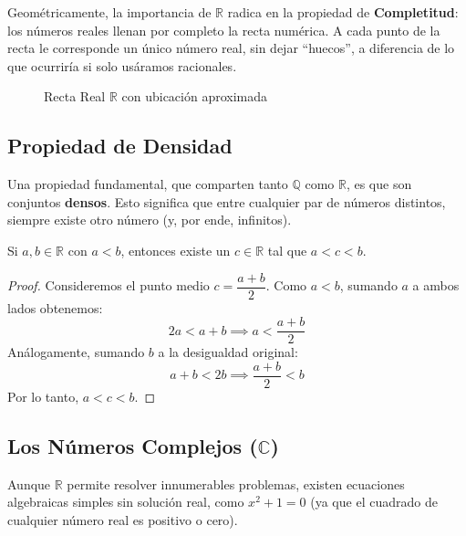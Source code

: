 Geométricamente, la importancia de $\mathbb{R}$ radica en la propiedad de \textbf{Completitud}: los números reales llenan por completo la recta numérica. A cada punto de la recta le corresponde un único número real, sin dejar ``huecos'', a diferencia de lo que ocurriría si solo usáramos racionales.

\begin{figure}[ht]
    \centering
    \caption{Recta Real $\mathbb{R}$ con ubicación aproximada}
    \label{fig:rectareal}
\end{figure}

\subsection{Propiedad de Densidad}
Una propiedad fundamental, que comparten tanto $\mathbb{Q}$ como $\mathbb{R}$, es que son conjuntos \textbf{densos}. Esto significa que entre cualquier par de números distintos, siempre existe otro número (y, por ende, infinitos).

\begin{proposition}
    Si $a,b\in\mathbb{R}$ con $a<b$, entonces existe un $c\in\mathbb{R}$ tal que $a<c<b$.
\end{proposition}

\begin{proof}
    Consideremos el punto medio $c=\dfrac{a+b}{2}$.
    Como $a<b$, sumando $a$ a ambos lados obtenemos:
    \[ 2a < a+b \implies a < \frac{a+b}{2} \]
    Análogamente, sumando $b$ a la desigualdad original:
    \[ a+b < 2b \implies \frac{a+b}{2} < b \]
    Por lo tanto, $a < c < b$.
\end{proof}

\subsection{Los Números Complejos ($\mathbb{C}$)}
Aunque $\mathbb{R}$ permite resolver innumerables problemas, existen ecuaciones algebraicas simples sin solución real, como $x^2+1=0$ (ya que el cuadrado de cualquier número real es positivo o cero).

